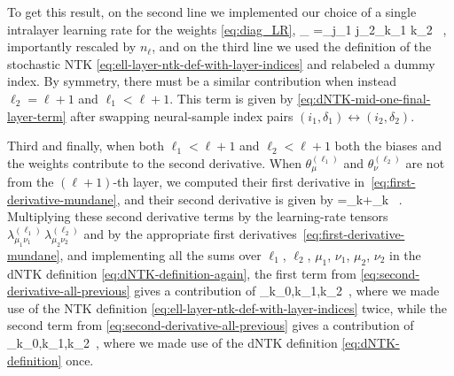 To get this result, on the second line we implemented
our choice of a single intralayer learning rate for the weights \eqref{eq:diag_LR},
\be
\lambda_{ }=\delta_{j_1 j_2}\delta_{k_1 k_2}  \, ,
\ee
importantly rescaled by $n_{\ell}$, and on the third line we used the definition of the stochastic NTK \eqref{eq:ell-layer-ntk-def-with-layer-indices} and relabeled a dummy index. %
By symmetry, there must be a similar contribution when instead  $\ell_2=\ell+1$ and $\ell_1 < \ell+1$. This term is given by \eqref{eq:dNTK-mid-one-final-layer-term} after swapping neural-sample index pairs $(i_1,\delta_1)\leftrightarrow(i_2,\delta_2)$.


Third and finally, when both $\ell_1 < \ell+1$ and $\ell_2 < \ell+1$ both the biases and the weights contribute to the second derivative. When $\theta_\mu^{(\ell_1)}$ and $\theta_\nu^{(\ell_2)}$ are not from the $(\ell+1)$-th layer, we computed their first derivative in~\eqref{eq:first-derivative-mundane}, and their second derivative is given by
\be\label{eq:second-derivative-all-previous}
=\sum_{k}+\sum_{k} \, .
\ee
Multiplying these second derivative terms by the learning-rate tensors $\lambda_{\mu_1\nu_1}^{(\ell_1)}\,\lambda_{\mu_2\nu_2}^{(\ell_2)}$ and by the appropriate first derivatives~\eqref{eq:first-derivative-mundane},  and implementing all the sums over  $\ell_1$, $\ell_2$, $\mu_1$, $\nu_1$, $\mu_2$, $\nu_2$ in the dNTK definition \eqref{eq:dNTK-definition-again}, the first term from  \eqref{eq:second-derivative-all-previous} gives a contribution of
\be\label{eq:dNTK-mid-no-final-layer-term-1}
\sum_{k_0,k_1,k_2}\, ,
\ee
where we made use of the NTK definition \eqref{eq:ell-layer-ntk-def-with-layer-indices}  twice, 
while the second term from \eqref{eq:second-derivative-all-previous} gives a contribution of
\be\label{eq:dNTK-mid-no-final-layer-term-2}
\sum_{k_0,k_1,k_2}\, ,
\ee
where we made use of the dNTK definition \eqref{eq:dNTK-definition} once.







